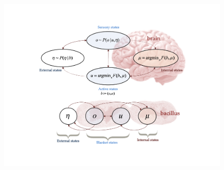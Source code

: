 \documentclass[review,12pt,authoryear]{elsarticle}
\begin{document}
\begin{figure}
    \centering
    \includegraphics[width=\textwidth]{FigureMarkovblanket.png}
\end{figure}
\end{document}
